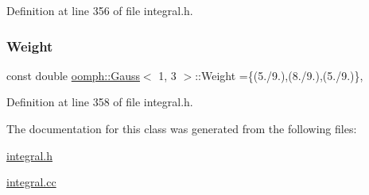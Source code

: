 Definition at line 356 of file integral.\+h.

\mbox{\label{classoomph_1_1Gauss_3_011_00_013_01_4_a2693359d8c45ff049ee0b68fc67a3199}} 
\subsubsection{\texorpdfstring{Weight}{Weight}}
{\footnotesize\ttfamily const double \hyperlink{classoomph_1_1Gauss}{oomph\+::\+Gauss}$<$ 1, 3 $>$\+::Weight =\{(5./9.),(8./9.),(5./9.)\}\hspace{0.3cm}{\ttfamily [static]}, {\ttfamily [private]}}



Definition at line 358 of file integral.\+h.



The documentation for this class was generated from the following files\+:\begin{DoxyCompactItemize}
\item 
\hyperlink{integral_8h}{integral.\+h}\item 
\hyperlink{integral_8cc}{integral.\+cc}\end{DoxyCompactItemize}
